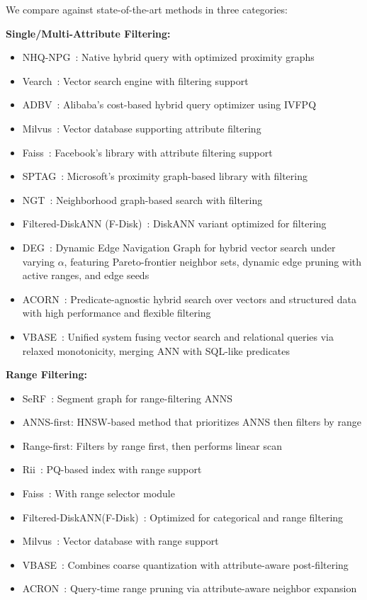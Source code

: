\documentclass[numbers,sort]{article}
\begin{document}
We compare against state-of-the-art methods in three categories:

\textbf{Single/Multi-Attribute Filtering:}

\begin{itemize}
  \item NHQ-NPG~\cite{wang2023efficient}: Native hybrid query with optimized proximity graphs
  \item Vearch~\cite{vearch}: Vector search engine with filtering support
  \item ADBV~\cite{zhu2020adbv}: Alibaba's cost-based hybrid query optimizer using IVFPQ
  \item Milvus~\cite{wang2021milvus}: Vector database supporting attribute filtering
  \item Faiss~\cite{johnson2019billion}: Facebook's library with attribute filtering support
  \item SPTAG~\cite{MicrosoftSPTAG}: Microsoft's proximity graph-based library with filtering
  \item NGT~\cite{yahooNGT}: Neighborhood graph-based search with filtering
  \item Filtered-DiskANN (F-Disk)~\cite{gollapudi2023filtered}: DiskANN variant optimized for filtering
  \item DEG~\cite{deg}: Dynamic Edge Navigation Graph for hybrid vector search under varying $\alpha$, featuring Pareto-frontier neighbor sets, dynamic edge pruning with active ranges, and edge seeds
  \item ACORN~\cite{patel2024acorn}: Predicate-agnostic hybrid search over vectors and structured data with high performance and flexible filtering
  \item VBASE~\cite{vbase}: Unified system fusing vector search and relational queries via relaxed monotonicity, merging ANN with SQL-like predicates
\end{itemize}

\textbf{Range Filtering:}
\begin{itemize}
    \item SeRF~\cite{zuo2024serf}: Segment graph for range-filtering ANNS
    \item ANNS-first: HNSW-based method that prioritizes ANNS then filters by range
    \item Range-first: Filters by range first, then performs linear scan
    \item Rii~\cite{matsui20xxrii}: PQ-based index with range support
    \item Faiss~\cite{johnson2019billion}: With range selector module
    \item Filtered-DiskANN(F-Disk)~\cite{gollapudi2023filtered}: Optimized for categorical and range filtering
    \item Milvus~\cite{wang2021milvus}: Vector database with range support
    \item VBASE~\cite{vbase}: Combines coarse quantization with attribute-aware post-filtering
    \item ACRON~\cite{patel2024acorn}: Query-time range pruning via attribute-aware neighbor expansion
\end{itemize}
\end{document}
